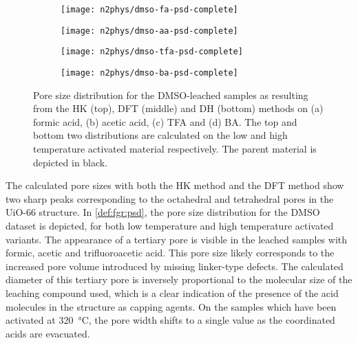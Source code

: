 \begin{figure}[!h]
    \centering

    \begin{subfigure}{0.25\linewidth}
        \texttt{[image: n2phys/dmso-fa-psd-complete]}%
        \caption{}%
        \label{def:fgr:psd-dmso-fa}
    \end{subfigure}%
    \begin{subfigure}{0.25\linewidth}
        \texttt{[image: n2phys/dmso-aa-psd-complete]}%
        \caption{}%
        \label{def:fgr:psd-dmso-aa}
    \end{subfigure}%
    \begin{subfigure}{0.25\linewidth}
        \texttt{[image: n2phys/dmso-tfa-psd-complete]}%
        \caption{}%
        \label{def:fgr:psd-dmso-tfa}
    \end{subfigure}%
    \begin{subfigure}{0.25\linewidth}
        \texttt{[image: n2phys/dmso-ba-psd-complete]}%
        \caption{}%
        \label{def:fgr:psd-dmso-ba}
    \end{subfigure}%

    \caption{Pore size distribution for the DMSO-leached
    samples as resulting from the HK (top), DFT (middle) and DH 
    (bottom) methods on (a) formic acid, (b) acetic acid, (c) TFA and 
    (d) BA. The top and bottom two distributions are
    calculated on the low and high temperature activated material
    respectively. The parent material is depicted in black.}%
    \label{def:fgr:psd}
        
\end{figure}

The calculated pore sizes with both the HK method and the DFT method 
show two sharp peaks corresponding to the octahedral and tetrahedral
pores in the UiO-66 structure. In \autoref{def:fgr:psd}, the pore
size distribution for the DMSO dataset is depicted, for both low
temperature and high temperature activated variants. The appearance of 
a tertiary pore is visible in the leached samples with formic,
acetic and trifluoroacetic acid. This pore size likely corresponds
to the increased pore volume introduced by missing linker-type 
defects. The calculated diameter of this tertiary pore is
inversely proportional to the molecular size of the 
leaching compound used, which is a clear indication of the presence of 
the acid molecules in the structure as capping agents. On the samples
which have been activated at \SI{320}{\degreeCelsius}, the pore width
shifts to a single value as the coordinated acids are evacuated.

